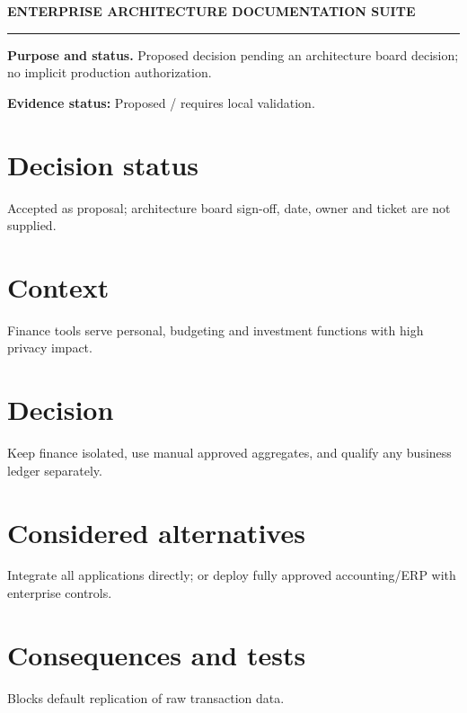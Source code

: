 \documentclass[10pt,letterpaper]{article}
\begin{document}
\begin{center}
{\large\bfseries\color{teal} ENTERPRISE ARCHITECTURE DOCUMENTATION SUITE}\par
{}\par
{}\par
\end{center}
\vspace{8pt}\hrule\vspace{12pt}
\textbf{Purpose and status.} Proposed decision pending an architecture board decision; no implicit production authorization.\par
\textbf{Evidence status:} Proposed / requires local validation.\par
\section{Decision status}
Accepted as proposal; architecture board sign-off, date, owner and ticket are not supplied.\par
\section{Context}
Finance tools serve personal, budgeting and investment functions with high privacy impact.\par
\section{Decision}
Keep finance isolated, use manual approved aggregates, and qualify any business ledger separately.\par
\section{Considered alternatives}
Integrate all applications directly; or deploy fully approved accounting/ERP with enterprise controls.\par
\section{Consequences and tests}
Blocks default replication of raw transaction data.\par
\end{document}
